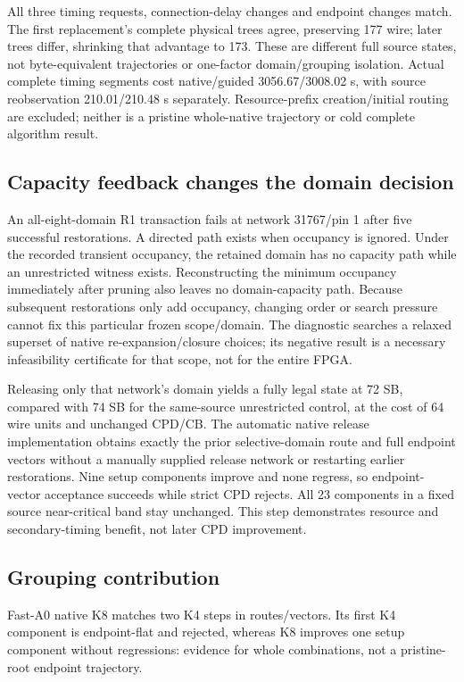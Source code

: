 \documentclass[conference,10pt]{IEEEtran}
\begin{document}
All three timing requests, connection-delay changes and endpoint changes match. The first replacement's complete physical trees agree, preserving 177 wire; later trees differ, shrinking that advantage to 173. These are different full source states, not byte-equivalent trajectories or one-factor domain/grouping isolation. Actual complete timing segments cost native/guided 3056.67/3008.02 s, with source reobservation 210.01/210.48 s separately. Resource-prefix creation/initial routing are excluded; neither is a pristine whole-native trajectory or cold complete algorithm result.

\subsection{Capacity feedback changes the domain decision}
An all-eight-domain R1 transaction fails at network 31767/pin 1 after five successful restorations. A directed path exists when occupancy is ignored. Under the recorded transient occupancy, the retained domain has no capacity path while an unrestricted witness exists. Reconstructing the minimum occupancy immediately after pruning also leaves no domain-capacity path. Because subsequent restorations only add occupancy, changing order or search pressure cannot fix this particular frozen scope/domain. The diagnostic searches a relaxed superset of native re-expansion/closure choices; its negative result is a necessary infeasibility certificate for that scope, not for the entire FPGA.

Releasing only that network's domain yields a fully legal state at 72 SB, compared with 74 SB for the same-source unrestricted control, at the cost of 64 wire units and unchanged CPD/CB. The automatic native release implementation obtains exactly the prior selective-domain route and full endpoint vectors without a manually supplied release network or restarting earlier restorations. Nine setup components improve and none regress, so endpoint-vector acceptance succeeds while strict CPD rejects. All 23 components in a fixed source near-critical band stay unchanged. This step demonstrates resource and secondary-timing benefit, not later CPD improvement.

\subsection{Grouping contribution}
Fast-A0 native K8 matches two K4 steps in routes/vectors. Its first K4 component is endpoint-flat and rejected, whereas K8 improves one setup component without regressions: evidence for whole combinations, not a pristine-root endpoint trajectory.
\end{document}
